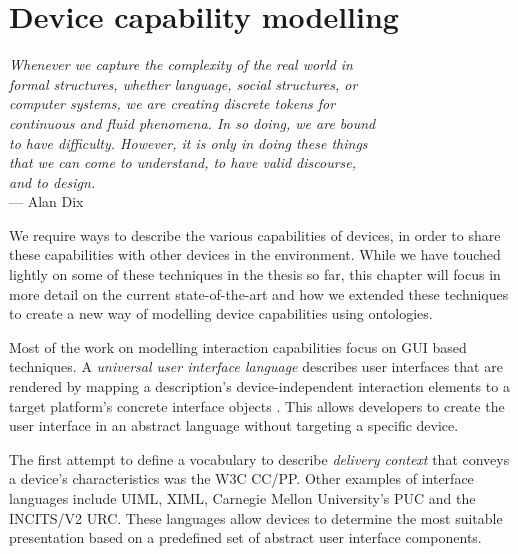 \chapter{Device capability modelling}
\label{DeviceCapabilityModelling}

\begin{flushright}{\slshape    
Whenever we capture the complexity of the real world in \\
formal structures, whether language, social structures, or \\
computer systems, we are creating discrete tokens for \\
continuous and fluid phenomena. In so doing, we are bound \\
to have difficulty. However, it is only in doing these things\\
 that we can come to understand, to have valid discourse,\\
 and to design.} \\ \medskip
    ---  Alan Dix
\end{flushright}



We require ways to describe the various capabilities of devices, in order to share these capabilities with other devices in the environment. While we have touched lightly on some of these techniques in the thesis so far, this chapter will focus in more detail on the current state-of-the-art and how we extended these techniques to create a new way of modelling device capabilities using ontologies.


Most of the work on modelling interaction capabilities focus on \ac{GUI} based techniques. A \emph{universal user interface language} describes user interfaces that are rendered by mapping a description's device-independent interaction elements to a target platform's concrete interface objects \cite{Lee2006}. This allows developers to create the user interface in an abstract language without targeting a specific device. 

The first attempt to define a vocabulary to describe \emph{delivery context} that conveys a device's characteristics was the W3C \ac{CC/PP}. Other examples of interface languages include \ac{UIML}, \ac{XIML}, Carnegie Mellon University's  \ac{PUC} and the \ac{INCITS/V2 URC}. These languages allow devices to determine the most suitable presentation based on a predefined set of abstract user interface components.

